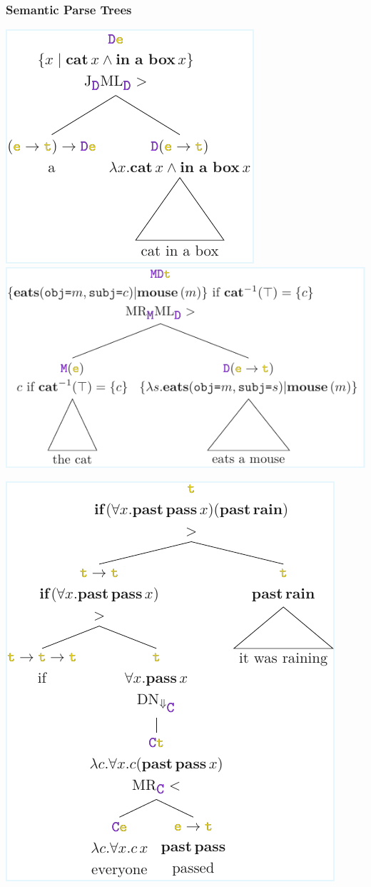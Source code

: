 \documentclass[math, english, info]{beamercours}
\begin{document}
\begin{frame}
	\frametitle{Semantic Parse Trees}
	\includegraphics{aux/figures/parse-tree-1.pdf}
	\centering
	\includegraphics{aux/figures/parse-tree-2.pdf}

	\centering \includegraphics[height=.7\pageheight]{aux/figures/parse-tree-3.pdf}
\end{frame}
\end{document}
